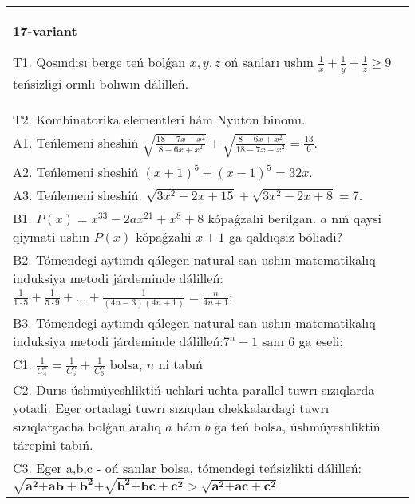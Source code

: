\documentclass{article}
\begin{document}
\begin{tabular}{m{17cm}}
\textbf{17-variant}
\newline

T1. Qosındısı berge teń bolǵan \(x,y,z\) oń sanları ushın \(\frac{1}{x} + \frac{1}{y} + \frac{1}{z} \geq 9\) teńsizligi orınlı bolıwın dálilleń. \\
T2. Kombinatorika elementleri hám Nyuton binomı. \\
A1. Teńlemeni sheshiń \(\sqrt{\frac{18 - 7x - x^{2}}{8 - 6x + x^{2}}} + \sqrt{\frac{8 - 6x + x^{2}}{18 - 7x - x^{2}}} = \frac{13}{6}\). \\
A2. Teńlemeni sheshiń \((x + 1)^{5} + (x - 1)^{5} = 32x\). \\
A3. Teńlemeni sheshiń. \(\sqrt{3x^{2} - 2x + 15} + \sqrt{3x^{2} - 2x + 8} = 7\). \\
B1. \(P(x) = x^{33} - 2ax^{21} + x^{8} + 8\) kópaǵzalıi berilgan. \(a\) nıń qaysi qiymati ushın \(P(x)\) kópaǵzalıi \(x + 1\) ga qaldıqsiz bóliadi? \\
B2. Tómendegi aytımdı qálegen natural san ushın matematikalıq induksiya metodi járdeminde dálilleń: \(\frac{1}{1 \cdot 5} + \frac{1}{5 \cdot 9} + ... + \frac{1}{(4n - 3)(4n + 1)} = \frac{n}{4n + 1}\); \\
B3. Tómendegi aytımdı qálegen natural san ushın matematikalıq induksiya metodi járdeminde dálilleń:\(7^{n} - 1\) sanı 6 ga eseli; \\
C1. \(\frac{1}{C_{4}^{n}} = \frac{1}{C_{5}^{n}} + \frac{1}{C_{6}^{n}}\) bolsa, \(n\) ni tabıń \\
C2. Durıs úshmúyeshliktiń uchlari uchta parallel tuwrı sızıqlarda yotadi. Eger ortadagi tuwrı sızıqdan chekkalardagi tuwrı sızıqlargacha bolǵan aralıq \(a\) hám \(b\) ga teń bolsa, úshmúyeshliktiń tárepini tabıń. \\
C3. Eger a,b,c - oń sanlar bolsa, tómendegi teńsizlikti dálilleń: \(\sqrt{\mathbf{a}^{\mathbf{2}}\mathbf{+ ab +}\mathbf{b}^{\mathbf{2}}}\mathbf{+}\sqrt{\mathbf{b}^{\mathbf{2}}\mathbf{+ bc +}\mathbf{c}^{\mathbf{2}}}\mathbf{>}\sqrt{\mathbf{a}^{\mathbf{2}}\mathbf{+ ac +}\mathbf{c}^{\mathbf{2}}}\) \\

\end{tabular}
\vspace{1cm}
\end{document}
